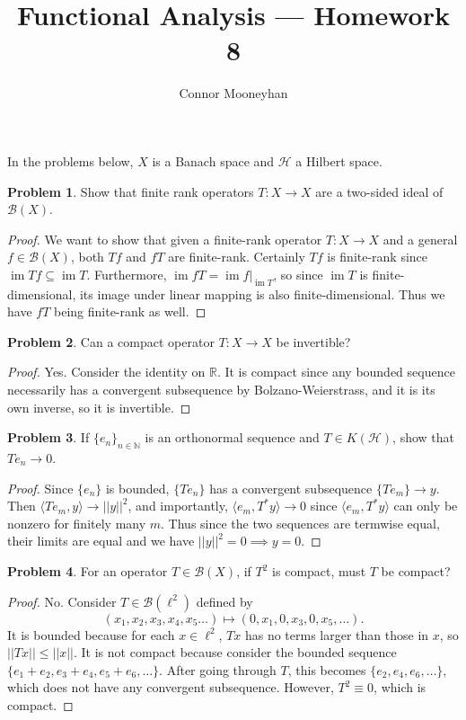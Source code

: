 \documentclass[12pt]{article}
\title{Functional Analysis --- Homework 8}
\author{Connor Mooneyhan}
\date{}
\DeclareMathOperator{\im}{im}
\theoremstyle{definition}
\newtheorem{ex}{Problem}
\begin{document}
\maketitle

In the problems below, $X$ is a Banach space and $\mathscr{H}$ a Hilbert space.

\begin{ex}
	Show that finite rank operators $T : X \to X$ are a two-sided ideal of $\mathcal{B}(X)$.
\end{ex}
\begin{proof}
	We want to show that given a finite-rank operator $T : X \to X$ and a general $f \in \mathcal{B}(X)$, both $Tf$ and $fT$ are finite-rank.
	Certainly $Tf$ is finite-rank since $\im Tf \subseteq \im T$.
	Furthermore, $\im fT = \im f|_{\im T}$, so since $\im T$ is finite-dimensional, its image under linear mapping is also finite-dimensional.
	Thus we have $fT$ being finite-rank as well.
\end{proof}

\begin{ex}
	Can a compact operator $T : X \to X$ be invertible?
\end{ex}
\begin{proof}
	Yes.
	Consider the identity on $\mathbb{R}$.
	It is compact since any bounded sequence necessarily has a convergent subsequence by Bolzano-Weierstrass, and it is its own inverse, so it is invertible.
\end{proof}

\begin{ex}
	If $\lbrace e_n \rbrace_{n \in \mathbb{N}}$ is an orthonormal sequence and $T \in K(\mathscr{H})$, show that $Te_n \to 0$.
\end{ex}
\begin{proof}
	Since $\lbrace e_n \rbrace$ is bounded, $\lbrace Te_n \rbrace$ has a convergent subsequence $\lbrace Te_m \rbrace \to y$.
	Then $\langle Te_m, y \rangle \to ||y||^2$, and importantly, $\langle e_m, T^*y \rangle \to 0$ since $\langle e_m, T^*y \rangle$ can only be nonzero for finitely many $m$.
	Thus since the two sequences are termwise equal, their limits are equal and we have $||y||^2 = 0 \implies y = 0$.
\end{proof}

\begin{ex}
	For an operator $T \in \mathcal{B}(X)$, if $T^2$ is compact, must $T$ be compact?
\end{ex}
\begin{proof}
  No.
  Consider $T \in \mathcal{B}(\ell^2)$ defined by \begin{equation*}
    (x_1, x_2, x_3, x_4, x_5 \dots) \mapsto (0, x_1, 0, x_3, 0, x_5, \dots).
  \end{equation*}
  It is bounded because for each $x \in \ell^2$, $Tx$ has no terms larger than those in $x$, so $||Tx|| \leq ||x||$. 
  It is not compact because consider the bounded sequence $\lbrace e_1 + e_2, e_3 + e_4, e_5 + e_6, \dots \rbrace$.
  After going through $T$, this becomes $\lbrace e_2, e_4, e_6, \dots \rbrace$, which does not have any convergent subsequence.
  However, $T^2 \equiv 0$, which is compact.
\end{proof}
\end{document}
